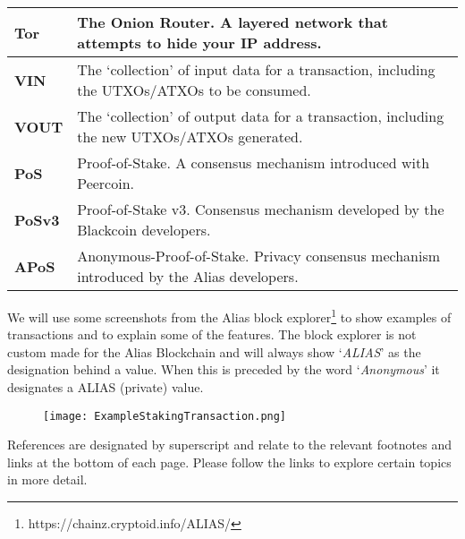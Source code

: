 \begin{table}[h]
{\begin{tabular}{@{}ll@{}}
\textbf{Tor} & The Onion Router. A layered network that attempts to hide 
your IP address. \\ 
\midrule
\textbf{VIN} & The ‘collection’ of input data for a transaction, including 
the UTXOs/ATXOs to be consumed. \\ 
\midrule
\textbf{VOUT} & The ‘collection’ of output data for a transaction, including 
the new UTXOs/ATXOs generated. \\ 
\midrule
\textbf{PoS} & Proof-of-Stake. A consensus mechanism introduced with Peercoin. \\ 
\midrule
\textbf{PoSv3} & Proof-of-Stake v3. Consensus mechanism developed by the 
Blackcoin developers. \\ 
\midrule
\textbf{APoS} & Anonymous-Proof-of-Stake. Privacy consensus mechanism 
introduced by the Alias developers. \\ 
\hline
\end{tabular}%
}
\end{table}
\noindent
We will use some screenshots from the Alias block
explorer\footnote{https://chainz.cryptoid.info/ALIAS/} to show examples of
transactions and to explain some of the features. The block explorer
is not custom made for the Alias Blockchain and will always show ‘\textit{ALIAS}’
as the designation behind a value. When this is preceded by the word
‘\textit{Anonymous}’ it designates a ALIAS (private) value.
\begin{figure}[ht]
	\centering
	\texttt{[image: ExampleStakingTransaction.png]}
\end{figure}
\noindent
References are designated by superscript and relate to the relevant
footnotes and links at the bottom of each page. Please follow the links to
explore certain topics in more detail.
